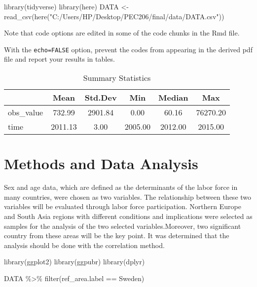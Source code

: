 \documentclass[
  12pt,
]{article}
\newenvironment{Shaded}{\begin{snugshade}}{\end{snugshade}}
\newcommand{\FunctionTok}[1]{\textcolor[rgb]{0.00,0.00,0.00}{#1}}
\newcommand{\NormalTok}[1]{#1}
\newcommand{\OtherTok}[1]{\textcolor[rgb]{0.56,0.35,0.01}{#1}}
\newcommand{\SpecialCharTok}[1]{\textcolor[rgb]{0.00,0.00,0.00}{#1}}
\newcommand{\StringTok}[1]{\textcolor[rgb]{0.31,0.60,0.02}{#1}}
\begin{document}
\begin{Shaded}
\begin{Highlighting}[]
\FunctionTok{library}\NormalTok{(tidyverse)}
\FunctionTok{library}\NormalTok{(here)}
\NormalTok{DATA }\OtherTok{\textless{}{-}} \FunctionTok{read\_csv}\NormalTok{(}\FunctionTok{here}\NormalTok{(}\StringTok{"C:/Users/HP/Desktop/PEC206/final/data/DATA.csv"}\NormalTok{))}
\end{Highlighting}
\end{Shaded}

Note that code options are edited in some of the code chunks in the Rmd file.

With the \texttt{echo=FALSE} option, prevent the codes from appearing in the derived pdf file and report your results in tables.

\begin{table}[ht]
\centering
\caption{Summary Statistics} 
\label{tab:summary}
\begin{tabular}{lccccc}
  \toprule
 & Mean & Std.Dev & Min & Median & Max \\ 
  \midrule
obs\_value & 732.99 & 2901.84 & 0.00 & 60.16 & 76270.20 \\ 
  time & 2011.13 & 3.00 & 2005.00 & 2012.00 & 2015.00 \\ 
   \bottomrule
\end{tabular}
\end{table}

\hypertarget{methods-and-data-analysis}{%
\section{Methods and Data Analysis}\label{methods-and-data-analysis}}

Sex and age data, which are defined as the determinants of the labor force in many countries, were chosen as two variables. The relationship between these two variables will be evaluated through labor force participation. Northern Europe and South Asia regions with different conditions and implications were selected as samples for the analysis of the two selected variables.Moreover, two significant country from these areas will be the key point. It was determined that the analysis should be done with the correlation method.

\begin{Shaded}
\begin{Highlighting}[]
\FunctionTok{library}\NormalTok{(ggplot2)}
\FunctionTok{library}\NormalTok{(ggpubr)}
\FunctionTok{library}\NormalTok{(dplyr)}

\NormalTok{DATA }\SpecialCharTok{\%\textgreater{}\%} \FunctionTok{filter}\NormalTok{(ref\_area.label }\SpecialCharTok{==} \StringTok{\textquotesingle{}Sweden\textquotesingle{}}\NormalTok{)}
\end{Highlighting}
\end{Shaded}
\end{document}

